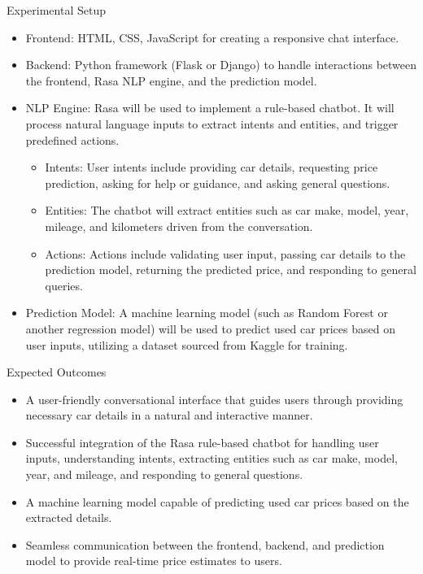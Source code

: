 \documentclass{beamer}
\begin{document}
\begin{frame}[t]{Experimental Setup}
    \begin{itemize}
        \item Frontend: HTML, CSS, JavaScript for creating a responsive chat interface.
        \item Backend: Python framework (Flask or Django) to handle interactions between the frontend, Rasa NLP engine, and the prediction model.
	\item NLP Engine: Rasa will be used to implement a rule-based chatbot. It will process natural language inputs to extract intents and entities, and trigger predefined actions.
	    \begin{itemize}
	        \item Intents: User intents include providing car details, requesting price prediction, asking for help or guidance, and asking general questions.
	        \item Entities: The chatbot will extract entities such as car make, model, year, mileage, and kilometers driven from the conversation.
	        \item Actions: Actions include validating user input, passing car details to the prediction model, returning the predicted price, and responding to general queries.
	    \end{itemize}
	\item Prediction Model: A machine learning model (such as Random Forest or another regression model) will be used to predict used car prices based on user inputs, utilizing a dataset sourced from Kaggle for training.

    \end{itemize}
\end{frame}

\begin{frame}[t]{Expected Outcomes}
    \begin{itemize}
	\item A user-friendly conversational interface that guides users through providing necessary car details in a natural and interactive manner.
	\item Successful integration of the Rasa rule-based chatbot for handling user inputs, understanding intents, extracting entities such as car make, model, year, and mileage, and responding to general questions.
	\item A machine learning model capable of predicting used car prices based on the extracted details.
	\item Seamless communication between the frontend, backend, and prediction model to provide real-time price estimates to users.

    \end{itemize}
\end{frame}
\end{document}
